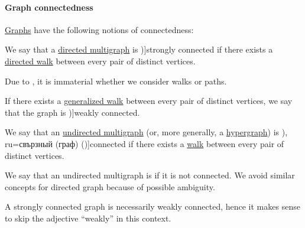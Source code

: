 \paragraph{Graph connectedness}

\begin{definition}\label{def:graph_connectedness}
  \hyperref[rem:arbitrary_kind_graph]{Graphs} have the following notions of connectedness:
  \begin{thmenum}
     We say that a \hyperref[def:directed_multigraph]{directed multigraph} is \term[ru=сильно связаный (граф) (\cite[def. 5.2]{БелоусовТкачёв2004})]{strongly connected} if there exists a \hyperref[def:graph_walk/directed]{directed walk} between every pair of distinct vertices.

    Due to , it is immaterial whether we consider walks or paths.

     If there exists a \hyperref[def:graph_walk/generalized]{generalized walk} between every pair of distinct vertices, we say that the graph is \term[ru=слабо связный (граф) (\cite[def. 5.4]{БелоусовТкачёв2004})]{weakly connected}.

     We say that an \hyperref[def:hypergraph/multigraph]{undirected multigraph} (or, more generally, a \hyperref[def:hypergraph]{hypergraph}) is \term[bg=свързан (граф) (\cite[13]{Мирчев2001}), ru=свързный (граф) (\cite[285]{БелоусовТкачёв2004})]{connected} if there exists a \hyperref[def:graph_walk/undirected]{walk} between every pair of distinct vertices.

    We say that an undirected multigraph is  if it is not connected. We avoid similar concepts for directed graph because of possible ambiguity.
  \end{thmenum}
\end{definition}
\begin{comments}
  \item A strongly connected graph is necessarily weakly connected, hence it makes sense to skip the adjective \enquote{weakly} in this context.
\end{comments}

